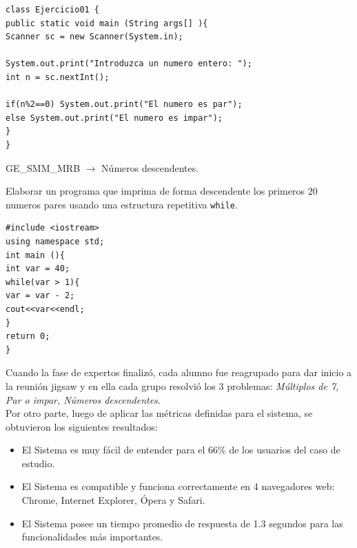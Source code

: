 \documentclass[twoside]{article}
\begin{document}
\begin{multicols}{2}
\begin{lstlisting}
class Ejercicio01 {
public static void main (String args[] ){
Scanner sc = new Scanner(System.in);

System.out.print("Introduzca un numero entero: ");
int n = sc.nextInt();

if(n%2==0) System.out.print("El numero es par");
else System.out.print("El numero es impar");
}
}
\end{lstlisting}

\begin{center}
	GE\_SMM\_MRB $\longrightarrow$ Números descendentes.
\end{center}

Elaborar un programa que imprima de forma descendente los primeros 20 numeros pares usando una estructura repetitiva \texttt{while}.

\lstset{language=C, breaklines=true, basicstyle=\footnotesize}
\begin{lstlisting}
#include <iostream>
using namespace std;
int main (){
int var = 40;
while(var > 1){
var = var - 2;
cout<<var<<endl;
}
return 0;
}
\end{lstlisting}

Cuando la fase de expertos finalizó, cada alumno fue reagrupado para dar inicio a la reunión jigsaw y en ella cada grupo resolvió los 3 problemas: \emph{Múltiplos de 7, Par o impar, Números descendentes}. \\

Por otro parte, luego de aplicar las métricas definidas para el sistema, se obtuvieron los siguientes resultados:

\begin{itemize}
	\item El Sistema es muy fácil de entender para el 66\% de los usuarios del caso de estudio.
	\item El Sistema es compatible y funciona correctamente en 4 navegadores web: Chrome, Internet Explorer, Ópera y Safari.
	\item El Sistema posee un tiempo promedio de respuesta de 1.3 segundos para las funcionalidades más importantes.
\end{itemize}


\end{multicols}
\end{document}

